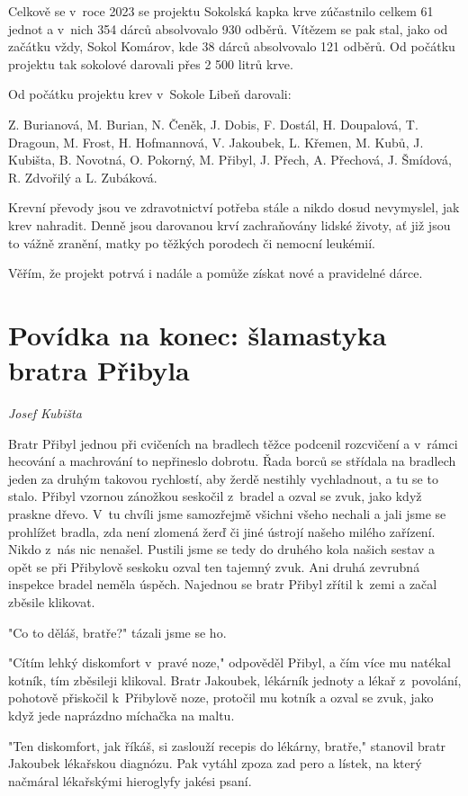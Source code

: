 \documentclass[a5paper, 11pt, twoside]{article}
\begin{document}
Celkově se v~roce 2023 se projektu Sokolská kapka krve zúčastnilo celkem
61 jednot a v~nich 354 dárců absolvovalo 930 odběrů. Vítězem se pak
stal, jako od začátku vždy, Sokol Komárov, kde 38 dárců absolvovalo 121
odběrů. Od počátku projektu tak sokolové darovali přes 2 500 litrů krve.

Od počátku projektu krev v~Sokole Libeň darovali:

Z. Burianová, M. Burian, N. Čeněk, J. Dobis, F. Dostál, H. Doupalová, T.
Dragoun, M. Frost, H. Hofmannová, V. Jakoubek, L. Křemen, M. Kubů, J.
Kubišta, B. Novotná, O. Pokorný, M. Přibyl, J. Přech, A. Přechová, J.
Šmídová, R. Zdvořilý a L. Zubáková.

Krevní převody jsou ve zdravotnictví potřeba stále a nikdo dosud
nevymyslel, jak krev nahradit. Denně jsou darovanou krví zachraňovány
lidské životy, ať již jsou to vážně zranění, matky po těžkých porodech
či nemocní leukémií.

Věřím, že projekt potrvá i nadále a pomůže získat nové a pravidelné
dárce.

\section{Povídka na konec: šlamastyka bratra
Přibyla}

\textit{Josef Kubišta}

Bratr Přibyl jednou při cvičeních na bradlech těžce podcenil rozcvičení
a v~rámci hecování a machrování to nepřineslo dobrotu. Řada borců se
střídala na bradlech jeden za druhým takovou rychlostí, aby žerdě
nestihly vychladnout, a tu se to stalo. Přibyl vzornou zánožkou seskočil
z~bradel a ozval se zvuk, jako když praskne dřevo. V~tu chvíli jsme
samozřejmě všichni všeho nechali a jali jsme se prohlížet bradla, zda
není zlomená žerď či jiné ústrojí našeho milého zařízení. Nikdo z~nás
nic nenašel. Pustili jsme se tedy do druhého kola našich sestav a opět
se při Přibylově seskoku ozval ten tajemný zvuk. Ani druhá zevrubná
inspekce bradel neměla úspěch. Najednou se bratr Přibyl zřítil k~zemi a
začal zběsile klikovat.

"Co to děláš, bratře?{}" tázali jsme se ho.

"Cítím lehký diskomfort v~pravé noze," odpověděl Přibyl, a čím více mu
natékal kotník, tím zběsileji klikoval. Bratr Jakoubek, lékárník jednoty
a lékař z~povolání, pohotově přiskočil k~Přibylově noze, protočil mu
kotník a ozval se zvuk, jako když jede naprázdno míchačka na maltu.

"Ten diskomfort, jak říkáš, si zaslouží recepis do lékárny, bratře,"
stanovil bratr Jakoubek lékařskou diagnózu. Pak vytáhl zpoza zad pero a
lístek, na který načmáral lékařskými hieroglyfy jakési psaní.
\end{document}
